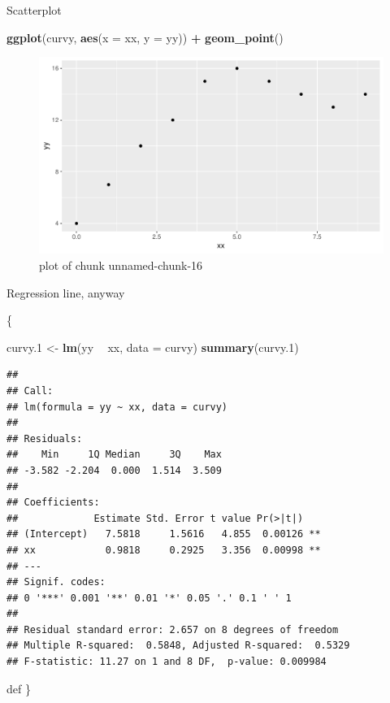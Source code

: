 \documentclass[ignorenonframetext,]{beamer}
\newenvironment{Shaded}{\begin{snugshade}}{\end{snugshade}}
\newcommand{\DataTypeTok}[1]{\textcolor[rgb]{0.13,0.29,0.53}{#1}}
\newcommand{\FloatTok}[1]{\textcolor[rgb]{0.00,0.00,0.81}{#1}}
\newcommand{\KeywordTok}[1]{\textcolor[rgb]{0.13,0.29,0.53}{\textbf{#1}}}
\newcommand{\NormalTok}[1]{#1}
\newcommand{\OperatorTok}[1]{\textcolor[rgb]{0.81,0.36,0.00}{\textbf{#1}}}
\newcommand{\StringTok}[1]{\textcolor[rgb]{0.31,0.60,0.02}{#1}}
\begin{document}
\begin{frame}[fragile]{Scatterplot}
\protect\hypertarget{scatterplot}{}

\begin{Shaded}
\begin{Highlighting}[]
\KeywordTok{ggplot}\NormalTok{(curvy, }\KeywordTok{aes}\NormalTok{(}\DataTypeTok{x =}\NormalTok{ xx, }\DataTypeTok{y =}\NormalTok{ yy)) }\OperatorTok{+}\StringTok{ }\KeywordTok{geom_point}\NormalTok{()}
\end{Highlighting}
\end{Shaded}

\begin{figure}
\centering
\includegraphics{figure/unnamed-chunk-16-1.pdf}
\caption{plot of chunk unnamed-chunk-16}
\end{figure}

\end{frame}

\begin{frame}[fragile]{Regression line, anyway}
\protect\hypertarget{regression-line-anyway}{}

\{\footnotesize

\begin{Shaded}
\begin{Highlighting}[]
\NormalTok{curvy}\FloatTok{.1}\NormalTok{ <-}\StringTok{ }\KeywordTok{lm}\NormalTok{(yy }\OperatorTok{~}\StringTok{ }\NormalTok{xx, }\DataTypeTok{data =}\NormalTok{ curvy)}
\KeywordTok{summary}\NormalTok{(curvy}\FloatTok{.1}\NormalTok{)}
\end{Highlighting}
\end{Shaded}

\begin{verbatim}
## 
## Call:
## lm(formula = yy ~ xx, data = curvy)
## 
## Residuals:
##    Min     1Q Median     3Q    Max 
## -3.582 -2.204  0.000  1.514  3.509 
## 
## Coefficients:
##             Estimate Std. Error t value Pr(>|t|)   
## (Intercept)   7.5818     1.5616   4.855  0.00126 **
## xx            0.9818     0.2925   3.356  0.00998 **
## ---
## Signif. codes:  
## 0 '***' 0.001 '**' 0.01 '*' 0.05 '.' 0.1 ' ' 1
## 
## Residual standard error: 2.657 on 8 degrees of freedom
## Multiple R-squared:  0.5848, Adjusted R-squared:  0.5329 
## F-statistic: 11.27 on 1 and 8 DF,  p-value: 0.009984
\end{verbatim}

def \}

\end{frame}
\end{document}
